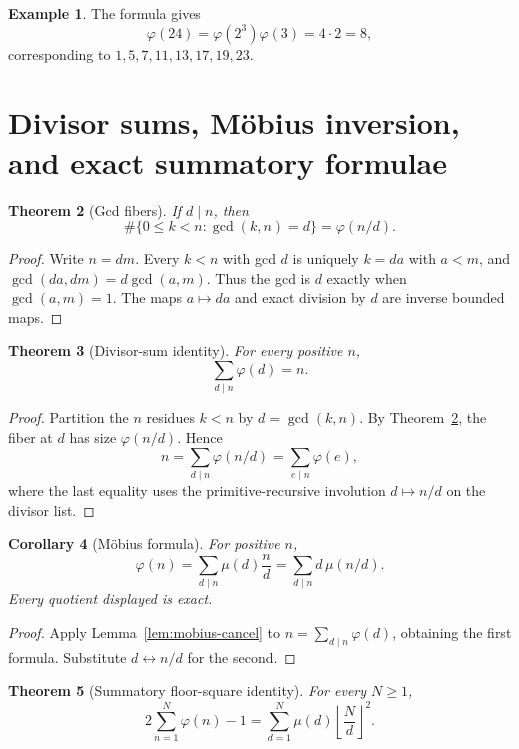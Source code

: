 \documentclass[11pt]{article}
\newtheorem{theorem}{Theorem}[section]
\newtheorem{corollary}[theorem]{Corollary}
\theoremstyle{definition}
\newtheorem{example}[theorem]{Example}
\begin{document}
\begin{example}
The formula gives
\[
 \varphi(24)=\varphi(2^3)\varphi(3)=4\cdot2=8,
\]
corresponding to \(1,5,7,11,13,17,19,23\).
\end{example}

\section{Divisor sums, M\"obius inversion, and exact summatory formulae}

\begin{theorem}[Gcd fibers]\label{thm:gcd-fiber}
If \(d\mid n\), then
\[
 \#\{0\le k<n:\gcd(k,n)=d\}=\varphi(n/d).
\]
\end{theorem}

\begin{proof}
Write \(n=dm\).  Every \(k<n\) with gcd \(d\) is uniquely \(k=da\) with
\(a<m\), and
\(\gcd(da,dm)=d\gcd(a,m)\).  Thus the gcd is \(d\) exactly when
\(\gcd(a,m)=1\).  The maps \(a\mapsto da\) and exact division by \(d\) are
inverse bounded maps.
\end{proof}

\begin{theorem}[Divisor-sum identity]\label{thm:sum-phi}
For every positive \(n\),
\[
 \boxed{\displaystyle\sum_{d\mid n}\varphi(d)=n.}
\]
\end{theorem}

\begin{proof}
Partition the \(n\) residues \(k<n\) by \(d=\gcd(k,n)\).  By
Theorem~\ref{thm:gcd-fiber}, the fiber at \(d\) has size \(\varphi(n/d)\).
Hence
\[
 n=\sum_{d\mid n}\varphi(n/d)=\sum_{e\mid n}\varphi(e),
\]
where the last equality uses the primitive-recursive involution
\(d\mapsto n/d\) on the divisor list.
\end{proof}

\begin{corollary}[M\"obius formula]\label{cor:phi-mobius}
For positive \(n\),
\[
 \boxed{\displaystyle
 \varphi(n)=\sum_{d\mid n}\mu(d)\frac nd
 =\sum_{d\mid n}d\,\mu(n/d).}
\]
Every quotient displayed is exact.
\end{corollary}

\begin{proof}
Apply Lemma~\ref{lem:mobius-cancel} to
\(n=\sum_{d\mid n}\varphi(d)\), obtaining the first formula.  Substitute
\(d\leftrightarrow n/d\) for the second.
\end{proof}

\begin{theorem}[Summatory floor-square identity]\label{thm:summatory-phi}
For every \(N\ge1\),
\[
 \boxed{\displaystyle
 2\sum_{n=1}^{N}\varphi(n)-1
 =\sum_{d=1}^{N}\mu(d)\left\lfloor\frac Nd\right\rfloor^2.}
\]
\end{theorem}
\end{document}
